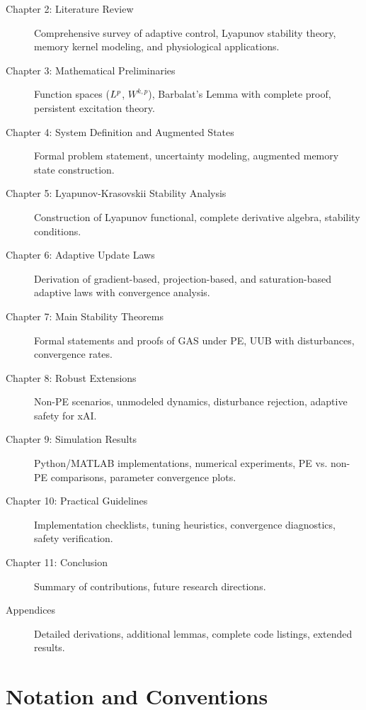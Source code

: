 \begin{description}
    \item[Chapter 2: Literature Review] Comprehensive survey of adaptive control, Lyapunov stability theory, memory kernel modeling, and physiological applications.

    \item[Chapter 3: Mathematical Preliminaries] Function spaces ($L^{p}$, $W^{k,p}$), Barbalat's Lemma with complete proof, persistent excitation theory.

    \item[Chapter 4: System Definition and Augmented States] Formal problem statement, uncertainty modeling, augmented memory state construction.

    \item[Chapter 5: Lyapunov-Krasovskii Stability Analysis] Construction of Lyapunov functional, complete derivative algebra, stability conditions.

    \item[Chapter 6: Adaptive Update Laws] Derivation of gradient-based, projection-based, and saturation-based adaptive laws with convergence analysis.

    \item[Chapter 7: Main Stability Theorems] Formal statements and proofs of GAS under PE, UUB with disturbances, convergence rates.

    \item[Chapter 8: Robust Extensions] Non-PE scenarios, unmodeled dynamics, disturbance rejection, adaptive safety for xAI.

    \item[Chapter 9: Simulation Results] Python/MATLAB implementations, numerical experiments, PE vs. non-PE comparisons, parameter convergence plots.

    \item[Chapter 10: Practical Guidelines] Implementation checklists, tuning heuristics, convergence diagnostics, safety verification.

    \item[Chapter 11: Conclusion] Summary of contributions, future research directions.

    \item[Appendices] Detailed derivations, additional lemmas, complete code listings, extended results.
\end{description}

\section{Notation and Conventions}


